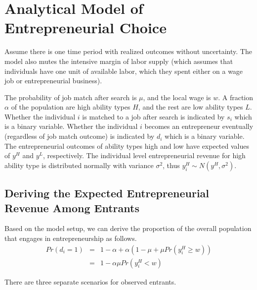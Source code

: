 \documentclass[letterpaper,12pt]{article}
\begin{document}
\appendix

\section{Analytical Model of Entrepreneurial Choice}

Assume there is one time period with realized outcomes without uncertainty. The model also mutes the intensive margin of labor supply (which assumes that individuals have one unit of available labor, which they spent either on a wage job or entrepreneurial business). 

The probability of job match after search is $\mu$, and the local wage is $w$. A fraction $\alpha$ of the population are high ability types $H$, and the rest are low ability types $L$. Whether the individual $i$ is matched to a job after search is indicated by $s_{i}$ which is a binary variable. Whether the individual $i$ becomes an entrepreneur eventually (regardless of job match outcome) is indicated by $d_{i}$ which is a binary variable. The entrepreneurial outcomes of ability types high and low have expected values of $y^{H}$ and $y^{L}$, respectively. The individual level entrepreneurial revenue for high ability type is distributed normally with variance $\sigma^{2}$, thus $y_{i}^{H}\sim N(y^{H},\sigma^{2})$.

\subsection{Deriving the Expected Entrepreneurial Revenue Among Entrants}
Based on the model setup, we can derive the proportion of the overall population that engages in entrepreneurship as follows.
\begin{eqnarray}
    Pr\left(d_{i}=1\right) &=& 1-\alpha + \alpha \left(1-\mu+\mu Pr\left(y^{H}_{i}\geq w\right) \right) \\
    &=& 1-\alpha\mu Pr(y^{H}_{i}<w)
\end{eqnarray}



There are three separate scenarios for observed entrants.
\end{document}
